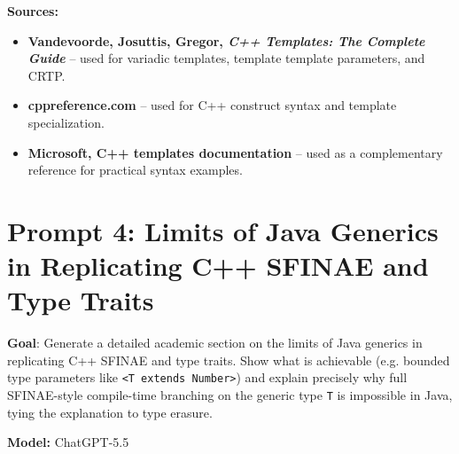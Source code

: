 \documentclass[11pt]{report}
\begin{document}
\noindent\textbf{Sources:}
\begin{itemize}
\item \textbf{Vandevoorde, Josuttis, Gregor, \emph{C++ Templates: The Complete Guide}} \cite{cpp_templates2017} -- used for variadic templates, template template parameters, and CRTP.
\item \textbf{cppreference.com} \cite{cppreference} -- used for C++ construct syntax and template specialization.
\item \textbf{Microsoft, C++ templates documentation} \cite{microsoftcpptemplates} -- used as a complementary reference for practical syntax examples.
\end{itemize}

\section{Prompt 4: Limits of Java Generics in Replicating C++ SFINAE and Type Traits}

\noindent\textbf{Goal}: Generate a detailed academic section on the limits of Java generics in replicating C++ SFINAE and type traits. Show what is achievable (e.g. bounded type parameters like \texttt{<T extends Number>}) and explain precisely why full SFINAE-style compile-time branching on the generic type \texttt{T} is impossible in Java, tying the explanation to type erasure.

\noindent\textbf{Model:} ChatGPT-5.5
\end{document}
